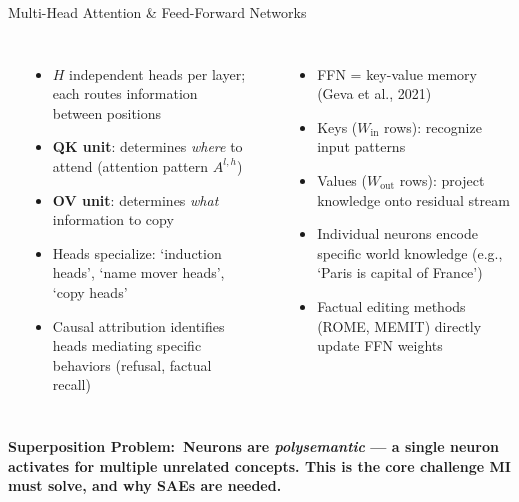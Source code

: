 \begin{frame}{Multi-Head Attention \& Feed-Forward Networks}
  \begin{columns}[T]
    {\small\bfseries{}}
    \begin{itemize}\footnotesize\setlength\itemsep{3pt}
      \item $H$ independent heads per layer; each routes information between positions
      \item \textbf{QK unit}: determines \emph{where} to attend (attention pattern $A^{l,h}$)
      \item \textbf{OV unit}: determines \emph{what} information to copy
      \item Heads specialize: `induction heads', `name mover heads', `copy heads'
      \item Causal attribution identifies heads mediating specific behaviors
        (refusal, factual recall)
    \end{itemize}

    {\small\bfseries{}}
    \begin{itemize}\footnotesize\setlength\itemsep{3pt}
      \item FFN = key-value memory (Geva et al., 2021)
      \item Keys ($W_{\text{in}}$ rows): recognize input patterns
      \item Values ($W_{\text{out}}$ rows): project knowledge onto residual stream
      \item Individual neurons encode specific world knowledge
        (e.g., `Paris is capital of France')
      \item Factual editing methods (ROME, MEMIT) directly update FFN weights
    \end{itemize}
  \end{columns}
  \vspace{0.3em}
  \begin{ucrwarn}
    \small\bfseries Superposition Problem:\normalfont\ Neurons are
    \emph{polysemantic} --- a single neuron activates for multiple unrelated
    concepts. This is the core challenge MI must solve, and why SAEs are needed.
  \end{ucrwarn}
\end{frame}

